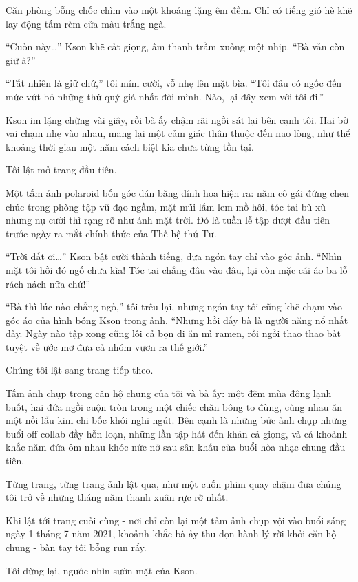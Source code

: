 \documentclass[../main.tex]{subfiles}
\begin{document}
Căn phòng bỗng chốc chìm vào một khoảng lặng êm đềm. Chỉ có tiếng gió hè khẽ lay động tấm rèm cửa màu trắng ngà.

``Cuốn này\dots'' Kson khẽ cất giọng, âm thanh trầm xuống một nhịp. ``Bà vẫn còn giữ à?''

``Tất nhiên là giữ chứ,'' tôi mỉm cười, vỗ nhẹ lên mặt bìa. ``Tôi đâu có ngốc đến mức vứt bỏ những thứ quý giá nhất đời mình. Nào, lại đây xem với tôi đi.''

Kson im lặng chừng vài giây, rồi bà ấy chậm rãi ngồi sát lại bên cạnh tôi. Hai bờ vai chạm nhẹ vào nhau, mang lại một cảm giác thân thuộc đến nao lòng, như thể khoảng thời gian một năm cách biệt kia chưa từng tồn tại.

Tôi lật mở trang đầu tiên.

Một tấm ảnh polaroid bốn góc dán băng dính hoa hiện ra: năm cô gái đứng chen chúc trong phòng tập vũ đạo ngầm, mặt mũi lấm lem mồ hôi, tóc tai bù xù nhưng nụ cười thì rạng rỡ như ánh mặt trời. Đó là tuần lễ tập dượt đầu tiên trước ngày ra mắt chính thức của Thế hệ thứ Tư.

``Trời đất ơi\dots'' Kson bật cười thành tiếng, đưa ngón tay chỉ vào góc ảnh. ``Nhìn mặt tôi hồi đó ngố chưa kìa! Tóc tai chẳng đâu vào đâu, lại còn mặc cái áo ba lỗ rách nách nữa chứ!''

``Bà thì lúc nào chẳng ngố,'' tôi trêu lại, nhưng ngón tay tôi cũng khẽ chạm vào góc áo của hình bóng Kson trong ảnh. ``Nhưng hồi đấy bà là người năng nổ nhất đấy. Ngày nào tập xong cũng lôi cả bọn đi ăn mì ramen, rồi ngồi thao thao bất tuyệt về ước mơ đưa cả nhóm vươn ra thế giới.''

Chúng tôi lật sang trang tiếp theo.

Tấm ảnh chụp trong căn hộ chung của tôi và bà ấy: một đêm mùa đông lạnh buốt, hai đứa ngồi cuộn tròn trong một chiếc chăn bông to đùng, cùng nhau ăn một nồi lẩu kim chi bốc khói nghi ngút. Bên cạnh là những bức ảnh chụp những buổi off-collab đầy hỗn loạn, những lần tập hát đến khản cả giọng, và cả khoảnh khắc năm đứa ôm nhau khóc nức nở sau sân khấu của buổi hòa nhạc chung đầu tiên.

Từng trang, từng trang ảnh lật qua, như một cuốn phim quay chậm đưa chúng tôi trở về những tháng năm thanh xuân rực rỡ nhất.

Khi lật tới trang cuối cùng - nơi chỉ còn lại một tấm ảnh chụp vội vào buổi sáng ngày 1 tháng 7 năm 2021, khoảnh khắc bà ấy thu dọn hành lý rời khỏi căn hộ chung - bàn tay tôi bỗng run rẩy.

Tôi dừng lại, ngước nhìn sườn mặt của Kson.
\end{document}
